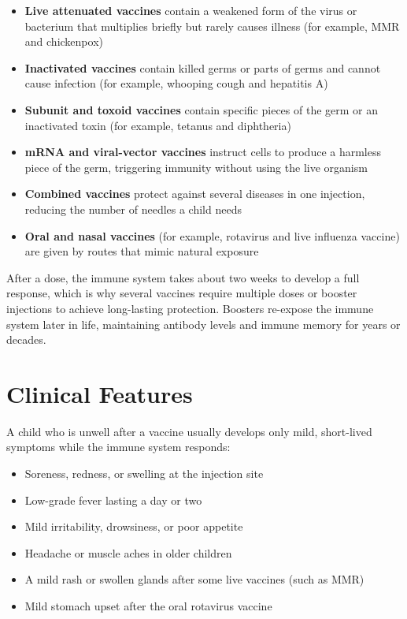 \begin{itemize}
    \item \textbf{Live attenuated vaccines} contain a weakened form of the virus or bacterium that multiplies briefly but rarely causes illness (for example, MMR and chickenpox)
    \item \textbf{Inactivated vaccines} contain killed germs or parts of germs and cannot cause infection (for example, whooping cough and hepatitis A)
    \item \textbf{Subunit and toxoid vaccines} contain specific pieces of the germ or an inactivated toxin (for example, tetanus and diphtheria)
    \item \textbf{mRNA and viral-vector vaccines} instruct cells to produce a harmless piece of the germ, triggering immunity without using the live organism
    \item \textbf{Combined vaccines} protect against several diseases in one injection, reducing the number of needles a child needs
    \item \textbf{Oral and nasal vaccines} (for example, rotavirus and live influenza vaccine) are given by routes that mimic natural exposure
\end{itemize}

After a dose, the immune system takes about two weeks to develop a full response, which is why several vaccines require multiple doses or booster injections to achieve long-lasting protection. Boosters re-expose the immune system later in life, maintaining antibody levels and immune memory for years or decades.

\section*{Clinical Features}
A child who is unwell after a vaccine usually develops only mild, short-lived symptoms while the immune system responds:

\begin{itemize}
    \item Soreness, redness, or swelling at the injection site
    \item Low-grade fever lasting a day or two
    \item Mild irritability, drowsiness, or poor appetite
    \item Headache or muscle aches in older children
    \item A mild rash or swollen glands after some live vaccines (such as MMR)
    \item Mild stomach upset after the oral rotavirus vaccine
\end{itemize}

